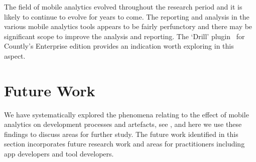 The field of mobile analytics evolved throughout the research period and it is likely to continue to evolve for years to come. The reporting and analysis in the various mobile analytics tools appears to be fairly perfunctory and there may be significant scope to improve the analysis and reporting. The `Drill' plugin~ for Countly's Enterprise edition provides an indication worth exploring in this aspect.




\clearpage
\section{Future Work}
We have systematically explored the phenomena relating to the effect of mobile analytics on development processes and artefacts, see , and here we use these findings to discuss areas for further study. The future work identified in this section incorporates future research work and areas for practitioners including app developers and tool developers.


